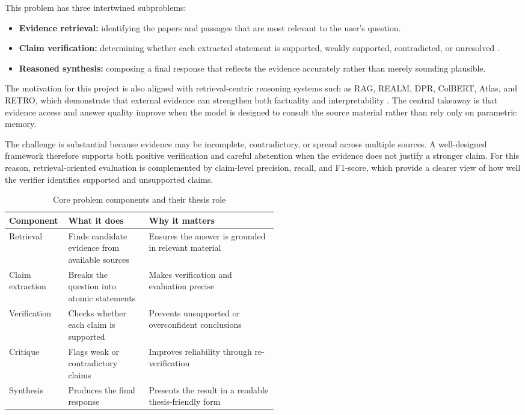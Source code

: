 This problem has three intertwined subproblems:
\begin{itemize}[leftmargin=*]
    \item \textbf{Evidence retrieval:} identifying the papers and passages that are most relevant to the user's question.
    \item \textbf{Claim verification:} determining whether each extracted statement is supported, weakly supported, contradicted, or unresolved \cite{thorne2018fever,wadden2020scifact,honovich2022true}.
    \item \textbf{Reasoned synthesis:} composing a final response that reflects the evidence accurately rather than merely sounding plausible.
\end{itemize}

The motivation for this project is also aligned with retrieval-centric reasoning systems such as RAG, REALM, DPR, ColBERT, Atlas, and RETRO, which demonstrate that external evidence can strengthen both factuality and interpretability \cite{lewis2020rag,guu2020realm,karpukhin2020dpr,khattab2020colbert,izacard2022atlas,borgeaud2022retro}. The central takeaway is that evidence access and answer quality improve when the model is designed to consult the source material rather than rely only on parametric memory.

The challenge is substantial because evidence may be incomplete, contradictory, or spread across multiple sources. A well-designed framework therefore supports both positive verification and careful abstention when the evidence does not justify a stronger claim.
For this reason, retrieval-oriented evaluation is complemented by claim-level precision, recall, and F1-score, which provide a clearer view of how well the verifier identifies supported and unsupported claims.

\begin{table}[H]
\centering
\begin{tabularx}{\linewidth}{>{\raggedright\arraybackslash}p{0.22\linewidth} >{\raggedright\arraybackslash}p{0.30\linewidth} >{\raggedright\arraybackslash}X}
\toprule
Component & What it does & Why it matters \\
\midrule
Retrieval & Finds candidate evidence from available sources & Ensures the answer is grounded in relevant material \\
Claim extraction & Breaks the question into atomic statements & Makes verification and evaluation precise \\
Verification & Checks whether each claim is supported & Prevents unsupported or overconfident conclusions \\
Critique & Flags weak or contradictory claims & Improves reliability through re-verification \\
Synthesis & Produces the final response & Presents the result in a readable thesis-friendly form \\
\bottomrule
\end{tabularx}
\caption{Core problem components and their thesis role}
\end{table}

